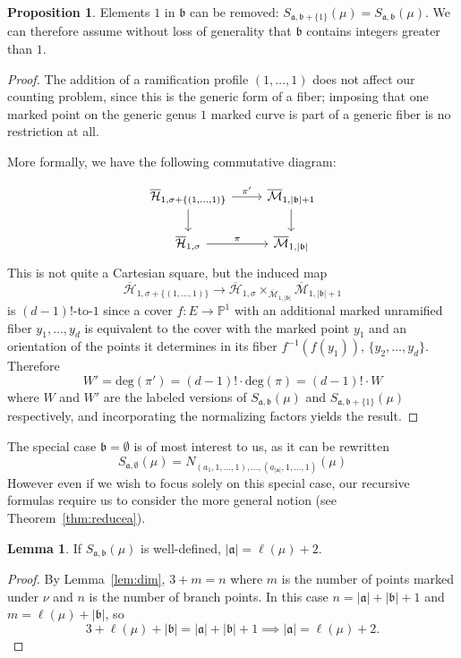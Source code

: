 \documentclass[11pt]{article}           %
\newcommand{\Hb}{\overline{\mathcal H}}
\renewcommand{\a}{\mathfrak a}
\renewcommand{\b}{\mathfrak b}
\renewcommand{\P}{\mathbb P}
\theoremstyle{definition}
\newtheorem{prop}[thm]{Proposition}
\newtheorem{lem}[thm]{Lemma}
\begin{document}
\begin{prop}
  Elements $1$ in $\b$ can be removed:
  $S_{\a,\b+\{1\}}(\mu)=S_{\a,\b}(\mu)$.
  We can therefore assume without loss of generality that $\b$ contains integers greater than $1$.
\end{prop}
\begin{proof}
  The addition of a ramification profile $(1,\dots,1)$ does not affect
  our counting problem, since this is the generic form of a fiber;
  imposing that one marked point on the
  generic genus $1$
  marked curve is part of a generic fiber is no restriction at all.

  More formally,
  we have the following commutative diagram:

  \[\begin{tikzcd}
\Hb_{1,\sigma+\{(1,\dots,1)\}} & \overline{\mathcal M}_{1,|\b|+1} \\
\Hb_{1,\sigma} & \overline{\mathcal M}_{1,|\b|}
	\arrow[from=1-1, to=1-2, "\pi'"]
	\arrow[from=1-1, to=2-1]
	\arrow[from=1-2, to=2-2]
	\arrow[from=2-1, to=2-2, "\pi"]
  \end{tikzcd}\]
  This is not quite a Cartesian square, but the induced map
  \[\Hb_{1,\sigma+\{(1,\dots,1)\}}\to \Hb_{1,\sigma}\times_{\overline{\mathcal M}_{1,|\b|}}\overline{\mathcal M}_{1,|\b|+1}
  \]
  is $(d-1)!$-to-$1$ since a cover $f:E\to\P^1$ with an additional marked unramified fiber
  $y_1,\dots,y_d$
  is equivalent to the cover with the marked point $y_1$ and an orientation
  of the points it determines in its fiber $f^{-1}(f(y_1))$, $\{y_2,\dots,y_d\}$.
  Therefore
  \[
  W'=\text{deg}(\pi')=(d-1)!\cdot\text{deg}(\pi)=(d-1)!\cdot W
  \]
  where $W$ and $W'$ are the labeled versions of $S_{\a,\b}(\mu)$ and
  $S_{\a,\b+\{1\}}(\mu)$ respectively, and incorporating the normalizing factors
  yields the result.
  \end{proof}

The special case $\b=\emptyset$ is of most interest to us, as it can be rewritten
\[
S_{\a,\emptyset}(\mu)=N_{(a_1,1,\dots,1),\dots,(a_{|\a|},1,\dots,1)}(\mu)
\]
However even if we wish to focus solely on this special case, our
recursive formulas require us to consider the more general notion (see
Theorem~\ref{thm:reducea}).



\begin{lem}
  \label{lem:Sabdim}
  If $S_{\mathfrak a,\mathfrak b}(\mu)$ is well-defined, $|\mathfrak a|=\ell(\mu)+2$.
\end{lem}
\begin{proof}
  By Lemma~\ref{lem:dim}, $3+m=n$ where $m$ is the number of points marked under $\nu$ and
  $n$ is the number of branch points. In this case $n=|\mathfrak a|+|\mathfrak b|+1$
  and $m=\ell(\mu)+|\mathfrak b|$, so
  \[
  3+\ell(\mu)+|\mathfrak b|=|\mathfrak a|+|\mathfrak b|+1\implies |\mathfrak a|=\ell(\mu)+2.
  \]
\end{proof}
\end{document}
